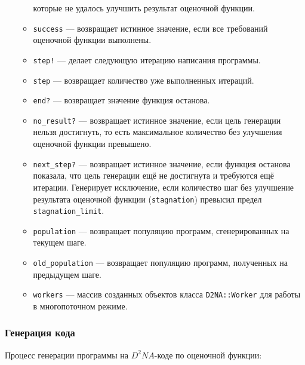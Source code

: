 \documentclass[utf8,a5paper,portrait,10pt,twoside]{eskdtext}
\begin{document}
\begin{itemize}
\begin{itemize}
                которые не удалось улучшить результат оценочной функции.
          \item \texttt{success} — возвращает истинное значение, если все
                требований оценочной функции выполнены.
          \item \texttt{step!} — делает следующую итерацию написания программы.
          \item \texttt{step} — возвращает количество уже выполненных итераций.
          \item \texttt{end?} — возвращает значение функция останова.
          \item \texttt{no\_result?} — возвращает истинное значение, если
                цель генерации нельзя достигнуть, то есть максимальное
                количество без улучшения оценочной функции превышено.
          \item \texttt{next\_step?} — возвращает истинное значение, если
                функция останова показала, что цель генерации ещё не достигнута
                и требуются ещё итерации. Генерирует исключение, если количество
                шаг без улучшение результата оценочной функции
                (\texttt{stagnation}) превысил предел\\
                \texttt{stagnation\_limit}.
          \item \texttt{population} — возвращает популяцию программ,
                сгенерированных на текущем шаге.
          \item \texttt{old\_population} — возвращает популяцию программ,
                полученных на предыдущем шаге.
          \item \texttt{workers} — массив созданных объектов класса
                \texttt{D2NA::Worker} для работы в многопоточном режиме.
        \end{itemize}
\end{itemize}

\newpage
\subsubsection{Генерация кода}

Процесс генерации программы на $D^2NA$-коде по оценочной функции:
\end{document}
